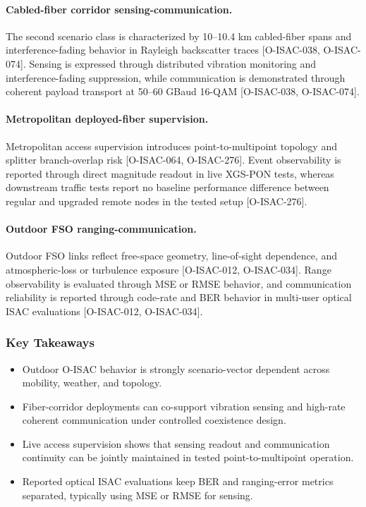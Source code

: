 \paragraph{Cabled-fiber corridor sensing-communication.}
The second scenario class is characterized by 10--10.4 km cabled-fiber spans and interference-fading behavior in Rayleigh backscatter traces [O-ISAC-038, O-ISAC-074]. Sensing is expressed through distributed vibration monitoring and interference-fading suppression, while communication is demonstrated through coherent payload transport at 50--60 GBaud 16-QAM [O-ISAC-038, O-ISAC-074].

\paragraph{Metropolitan deployed-fiber supervision.}
Metropolitan access supervision introduces point-to-multipoint topology and splitter branch-overlap risk [O-ISAC-064, O-ISAC-276]. Event observability is reported through direct magnitude readout in live XGS-PON tests, whereas downstream traffic tests report no baseline performance difference between regular and upgraded remote nodes in the tested setup [O-ISAC-276].

\paragraph{Outdoor FSO ranging-communication.}
Outdoor FSO links reflect free-space geometry, line-of-sight dependence, and atmospheric-loss or turbulence exposure [O-ISAC-012, O-ISAC-034]. Range observability is evaluated through MSE or RMSE behavior, and communication reliability is reported through code-rate and BER behavior in multi-user optical ISAC evaluations [O-ISAC-012, O-ISAC-034].

\subsubsection{Key Takeaways}
\begin{itemize}
\item Outdoor O-ISAC behavior is strongly scenario-vector dependent across mobility, weather, and topology.
\item Fiber-corridor deployments can co-support vibration sensing and high-rate coherent communication under controlled coexistence design.
\item Live access supervision shows that sensing readout and communication continuity can be jointly maintained in tested point-to-multipoint operation.
\item Reported optical ISAC evaluations keep BER and ranging-error metrics separated, typically using MSE or RMSE for sensing.
\end{itemize}

